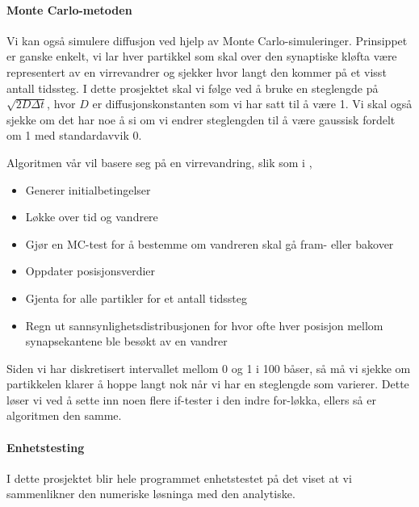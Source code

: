\documentclass[norsk, 10pt]{article}
\begin{document}
\paragraph{Monte Carlo-metoden}
Vi kan også simulere diffusjon ved hjelp av Monte Carlo-simuleringer. Prinsippet er ganske enkelt, vi lar hver partikkel som skal over den synaptiske kløfta være representert av en virrevandrer og sjekker hvor langt den kommer på et visst antall tidssteg. I dette prosjektet skal vi følge \cite{farnell} ved å bruke en steglengde på $\sqrt{2D\Delta t}$, hvor $D$ er diffusjonskonstanten som vi har satt til å være 1. Vi skal også sjekke om det har noe å si om vi endrer steglengden til å være gaussisk fordelt om 1 med standardavvik 0.

Algoritmen vår vil basere seg på en virrevandring, slik som i \cite{mhj},
\begin{itemize}
\item 
Generer initialbetingelser
\item 
Løkke over tid og vandrere
\item
Gjør en MC-test for å bestemme om vandreren skal gå fram- eller bakover
\item
Oppdater posisjonsverdier
\item
Gjenta for alle partikler for et antall tidssteg
\item
Regn ut sannsynlighetsdistribusjonen for hvor ofte hver posisjon mellom synapsekantene ble besøkt av en vandrer
\end{itemize}

Siden vi har diskretisert intervallet mellom 0 og 1 i 100 båser, så må vi sjekke om partikkelen klarer å hoppe langt nok når vi har en steglengde som varierer. Dette løser vi ved å sette inn noen flere if-tester i den indre for-løkka, ellers så er algoritmen den samme.

\paragraph{Enhetstesting}
I dette prosjektet blir hele programmet enhetstestet på det viset at vi sammenlikner den numeriske løsninga med den analytiske.
\end{document}

